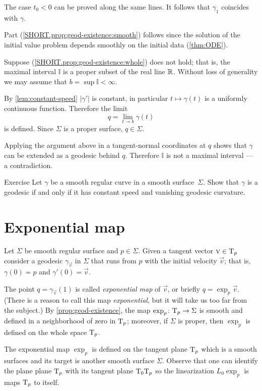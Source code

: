 The case $t_0<0$ can be proved along the same lines.
It follows that $\gamma_1$ coincides with $\gamma$.

Part (\ref{SHORT.prop:geod-existence:smooth}) follows since the solution of the initial value problem depends smoothly on the initial data (\ref{thm:ODE}).

Suppose (\ref{SHORT.prop:geod-existence:whole}) does not hold;
that is, the maximal interval $\mathbb{I}$ is a proper subset of the real line $\mathbb{R}$.
Without loss of generality we may assume that $b=\sup\mathbb{I}<\infty$.

By \ref{lem:constant-speed} $|\gamma'|$ is constant, in particular $t\mapsto \gamma(t)$ is a uniformly continuous function.
Therefore  the limit 
\[q=\lim_{t\to b}\gamma(t)\] 
is defined.
Since $\Sigma$ is a proper surface, $q\in \Sigma$. 

Applying the argument above in a tangent-normal coordinates at $q$ shows that $\gamma$ can be extended as a geodesic behind $q$.
Therefore $\mathbb{I}$ is not a maximal interval --- a contradiction.
\qeds


\begin{thm}{Exercise}\label{ex:geodesic-curvature}
Let $\gamma$ be a smooth regular curve in a smooth surface~$\Sigma$.
Show that $\gamma$ is a geodesic if and only if it has constant speed and vanishing geodesic curvature.
\end{thm}

\section*{Exponential map}\label{sec:exp}

Let $\Sigma$ be smooth regular surface and $p\in \Sigma$.
Given a tangent vector ${\textsc v}\in \mathrm{T}_p$ consider a geodesic $\gamma_{\vec v}$ in $\Sigma$ that runs from $p$ with the initial velocity ${\vec v}$;  
that is, $\gamma(0)=p$ and $\gamma'(0)={\vec v}$.

The point $q=\gamma_{\vec v}(1)$ is called \emph{exponential map} of ${\vec v}$, or briefly $q=\exp_p{\vec v}$.
(There is a reason to call this map \emph{exponential}, but it will take us too far from the subject.)
By \ref{prop:geod-existence}, the map $\exp_p\colon\mathrm{T}_p\to \Sigma$ is smooth and defined in a neighborhood of zero in $\mathrm{T}_p$;
moreover, if $\Sigma$ is proper, then $\exp_p$ is defined on the whole space $\mathrm{T}_p$.

The exponential map $\exp_p$ 
is defined on the tangent plane $\mathrm{T}_p$ which is a smooth surfaces
and its target is another smooth surface $\Sigma$.
Observe that one can identify the plane plane $\mathrm{T}_p$
with its tangent plane $\mathrm{T}_0\mathrm{T}_p$ so the linearization $L_0\exp_p$ is maps $\mathrm{T}_p$ to itself.


